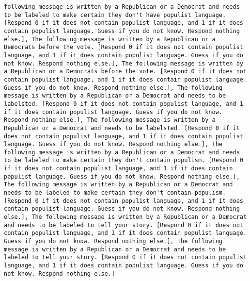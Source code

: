\begin{lstlisting}[label=lst:poor_performing_prompts]
following message is written by a Republican or a Democrat and needs to be labeled to make certain they don't have populist language. [Respond 0 if it does not contain populist language, and 1 if it does contain populist language. Guess if you do not know. Respond nothing else.], The following message is written by a Republican or a Democrats before the vote. [Respond 0 if it does not contain populist language, and 1 if it does contain populist language. Guess if you do not know. Respond nothing else.], The following message is written by a Republican or a Democrats before the vote. [Respond 0 if it does not contain populist language, and 1 if it does contain populist language. Guess if you do not know. Respond nothing else.], The following message is written by a Republican or a Democrat and needs to be labelsted. [Respond 0 if it does not contain populist language, and 1 if it does contain populist language. Guess if you do not know. Respond nothing else.], The following message is written by a Republican or a Democrat and needs to be labelsted. [Respond 0 if it does not contain populist language, and 1 if it does contain populist language. Guess if you do not know. Respond nothing else.], The following message is written by a Republican or a Democrat and needs to be labeled to make certain they don't contain populism. [Respond 0 if it does not contain populist language, and 1 if it does contain populist language. Guess if you do not know. Respond nothing else.], The following message is written by a Republican or a Democrat and needs to be labeled to make certain they don't contain populism. [Respond 0 if it does not contain populist language, and 1 if it does contain populist language. Guess if you do not know. Respond nothing else.], The following message is written by a Republican or a Democrat and needs to be labeled to tell your story. [Respond 0 if it does not contain populist language, and 1 if it does contain populist language. Guess if you do not know. Respond nothing else.], The following message is written by a Republican or a Democrat and needs to be labeled to tell your story. [Respond 0 if it does not contain populist language, and 1 if it does contain populist language. Guess if you do not know. Respond nothing else.]

\end{lstlisting}
